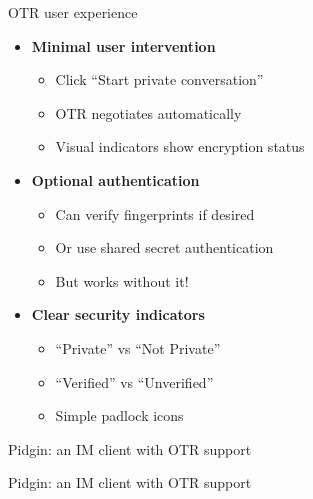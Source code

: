 \documentclass[aspectratio=169, lualatex, handout]{beamer}
\begin{document}
\begin{frame}{OTR user experience}
	\begin{itemize}
		\item \textbf{Minimal user intervention}
		      \begin{itemize}
			      \item Click ``Start private conversation''
			      \item OTR negotiates automatically
			      \item Visual indicators show encryption status
		      \end{itemize}
		\item \textbf{Optional authentication}
		      \begin{itemize}
			      \item Can verify fingerprints if desired
			      \item Or use shared secret authentication
			      \item But works without it!
		      \end{itemize}
		\item \textbf{Clear security indicators}
		      \begin{itemize}
			      \item ``Private'' vs ``Not Private''
			      \item ``Verified'' vs ``Unverified''
			      \item Simple padlock icons
		      \end{itemize}
	\end{itemize}
\end{frame}

\begin{frame}{Pidgin: an IM client with OTR support}
\end{frame}

\begin{frame}{Pidgin: an IM client with OTR support}
\end{frame}
\end{document}
